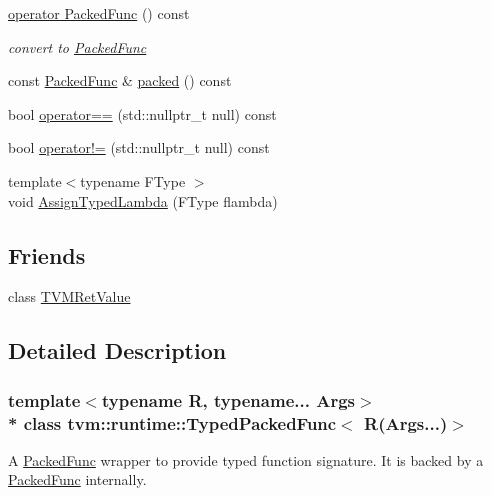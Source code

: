 \begin{DoxyCompactItemize}
\hyperlink{classtvm_1_1runtime_1_1TypedPackedFunc_3_01R_07Args_8_8_8_08_4_ad81c4bf7bbdfab20e9c9d58699d6c4a5}{operator Packed\+Func} () const 
\begin{DoxyCompactList}\small\item\em convert to \hyperlink{classtvm_1_1runtime_1_1PackedFunc}{Packed\+Func} \end{DoxyCompactList}\item 
const \hyperlink{classtvm_1_1runtime_1_1PackedFunc}{Packed\+Func} \& \hyperlink{classtvm_1_1runtime_1_1TypedPackedFunc_3_01R_07Args_8_8_8_08_4_ac0ad0eb56ab0f12d91adb50dab38ddab}{packed} () const 
\item 
bool \hyperlink{classtvm_1_1runtime_1_1TypedPackedFunc_3_01R_07Args_8_8_8_08_4_afa9327d129526d40c966fafc35255cad}{operator==} (std\+::nullptr\+\_\+t null) const 
\item 
bool \hyperlink{classtvm_1_1runtime_1_1TypedPackedFunc_3_01R_07Args_8_8_8_08_4_a890186f176c5553331af9c9de8d60e5c}{operator!=} (std\+::nullptr\+\_\+t null) const 
\item 
{\footnotesize template$<$typename F\+Type $>$ }\\void \hyperlink{classtvm_1_1runtime_1_1TypedPackedFunc_3_01R_07Args_8_8_8_08_4_a617bb54ee3fbe9704131229efd0d903c}{Assign\+Typed\+Lambda} (F\+Type flambda)
\end{DoxyCompactItemize}
\subsection*{Friends}
\begin{DoxyCompactItemize}
\item 
class \hyperlink{classtvm_1_1runtime_1_1TypedPackedFunc_3_01R_07Args_8_8_8_08_4_ae0ea8b4adc6dab8c74086bceaef6b3e1}{T\+V\+M\+Ret\+Value}
\end{DoxyCompactItemize}


\subsection{Detailed Description}
\subsubsection*{template$<$typename R, typename... Args$>$\\*
class tvm\+::runtime\+::\+Typed\+Packed\+Func$<$ R(\+Args...)$>$}

A \hyperlink{classtvm_1_1runtime_1_1PackedFunc}{Packed\+Func} wrapper to provide typed function signature. It is backed by a \hyperlink{classtvm_1_1runtime_1_1PackedFunc}{Packed\+Func} internally. 

